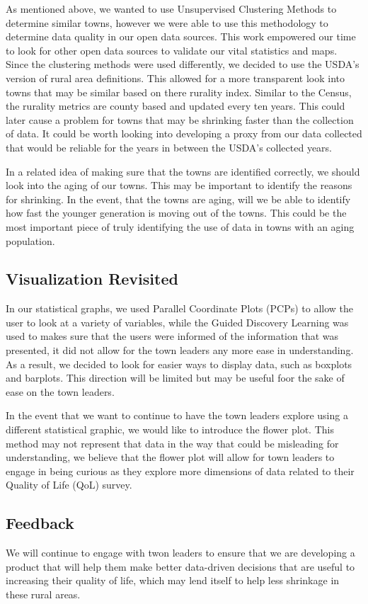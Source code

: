 \documentclass[letterpaper,inpress]{jdsart}
\begin{document}
As mentioned above, we wanted to use Unsupervised Clustering Methods to determine similar towns, however we were able to use this methodology to determine data quality in our open data sources. This work empowered our time to look for other open data sources to validate our vital statistics and maps. Since the clustering methods were used differently, we decided to use the USDA's version of rural area definitions. This allowed for a more transparent look into towns that may be similar based on there rurality index. Similar to the Census, the rurality metrics are county based and updated every ten years. This could later cause a problem for towns that may be shrinking faster than the collection of data. It could be worth looking into developing a proxy from our data collected that would be reliable for the years in between the USDA's collected years.

In a related idea of making sure that the towns are identified correctly, we should look into the aging of our towns. This may be important to identify the reasons for shrinking. In the event, that the towns are aging, will we be able to identify how fast the younger generation is moving out of the towns. This could be the most important piece of truly identifying the use of data in towns with an aging population.

\subsection{Visualization Revisited}

In our statistical graphs, we used Parallel Coordinate Plots (PCPs) to allow the user to look at a variety of variables, while the Guided Discovery Learning was used to makes sure that the users were informed of the information that was presented, it did not allow for the town leaders any more ease in understanding. As a result, we decided to look for easier ways to display data, such as boxplots and barplots. This direction will be limited but may be useful foor the sake of ease on the town leaders.

In the event that we want to continue to have the town leaders explore using a different statistical graphic, we would like to introduce the flower plot. This method may not represent that data in the way that could be misleading for understanding, we believe that the flower plot will allow for town leaders to engage in being curious as they explore more dimensions of data related to their Quality of Life (QoL) survey.

\subsection{Feedback}

We will continue to engage with twon leaders to ensure that we are developing a product that will help them make better data-driven decisions that are useful to increasing their quality of life, which may lend itself to help less shrinkage in these rural areas.



\end{document}
